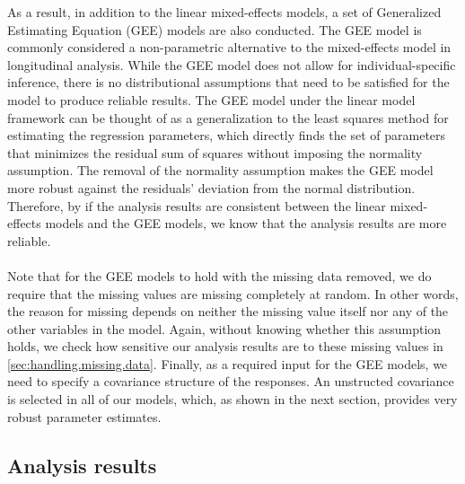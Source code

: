 \noindent As a result, in addition to the linear mixed-effects models, a set of Generalized Estimating Equation (GEE) models are also conducted. The GEE model is commonly considered a non-parametric alternative to the mixed-effects model in longitudinal analysis. While the GEE model does not allow for individual-specific inference, there is no distributional assumptions that need to be satisfied for the model to produce reliable results. The GEE model under the linear model framework can be thought of as a generalization to the least squares method for estimating the regression parameters, which directly finds the set of parameters that minimizes the residual sum of squares without imposing the normality assumption. The removal of the normality assumption makes the GEE model more robust against the residuals' deviation from the normal distribution. Therefore, by if the analysis results are consistent between the linear mixed-effects models and the GEE models, we know that the analysis results are more reliable.\\\\
Note that for the GEE models to hold with the missing data removed, we do require that the missing values are missing completely at random. In other words, the reason for missing depends on neither the missing value itself nor any of the other variables in the model. Again, without knowing whether this assumption holds, we check how sensitive our analysis results are to these missing values in \cref{sec:handling.missing.data}. Finally, as a required input for the GEE models, we need to specify a covariance structure of the responses. An unstructed covariance is selected in all of our models, which, as shown in the next section, provides very robust parameter estimates.
\subsection{Analysis results}\label{sec:analysis.results}
